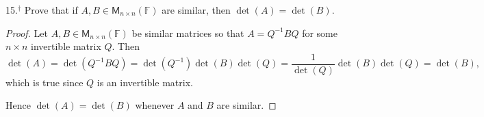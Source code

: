 \documentclass[11pt]{article}
\begin{document}
15.$^{\dagger}$ Prove that if $A,B\in\mathsf{M}_{n\times n}(\mathbb{F})$ are similar, then $\det(A) = \det(B)$.

\begin{proof}
    Let $A,B\in\mathsf{M}_{n\times n}(\mathbb{F})$ be similar matrices so that $A = Q^{-1}BQ$ for some $n\times n$ invertible matrix $Q$. Then $$\det(A) = \det(Q^{-1}BQ) = \det(Q^{-1})\det(B)\det(Q) = \frac{1}{\det(Q)}\det(B)\det(Q) = \det(B),$$ which is true since $Q$ is an invertible matrix.

    Hence $\det(A) = \det(B)$ whenever $A$ and $B$ are similar.
\end{proof}
\end{document}
